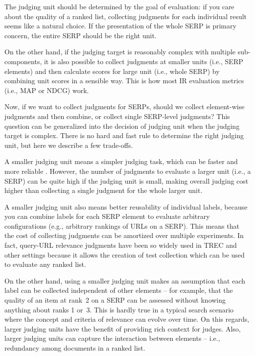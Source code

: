 The judging unit should be determined by the goal of evaluation: if you care about the quality of a ranked list, collecting judgments for each individual result seems like a natural choice. If the presentation of the whole SERP is primary concern, the entire SERP should be the right unit.

On the other hand, if the judging target is reasonably complex with multiple sub-components, it is also possible to collect judgments at smaller units (i.e., SERP elements) and then calculate scores for large unit (i.e., whole SERP) by combining unit scores in a sensible way. This is how most IR evaluation metrics (i.e., MAP or NDCG) work.

Now, if we want to collect judgments for SERPs, should we collect element-wise judgments and then combine, or collect single SERP-level judgments? This question can be generalized into the decision of judging unit when the judging target is complex. There is no hard and fast rule to determine the right judging unit, but here we describe a few trade-offs. 

A smaller judging unit means a simpler judging task, which can be faster and more reliable . However, the number of judgments to evaluate a larger unit (i.e., a SERP) can be quite high if the judging unit is small, making overall judging cost higher than collecting a single judgment for the whole larger unit.

A smaller judging unit also means better reusability of individual labels, because you can combine labels for each SERP element to evaluate arbitrary configurations (e.g., arbitrary rankings of URLs on a SERP). This means that the cost of collecting judgments can be amortized over multiple experiments. In fact, query-URL relevance judgments have been so widely used in TREC and other settings because it allows the creation of test collection which can be used to evaluate any ranked list.

On the other hand, using a smaller judging unit makes an assumption that each label can be collected independent of other elements -- for example, that the quality of an item at rank~2 on a SERP can be assessed without knowing anything about ranks 1 or~3. This is hardly true in a typical search scenario where the concept and criteria of relevance can evolve over time. On this regards, larger judging units have the benefit of providing rich context for judges. Also, larger judging units can capture the interaction between elements -- i.e., redundancy among documents in a ranked list.

